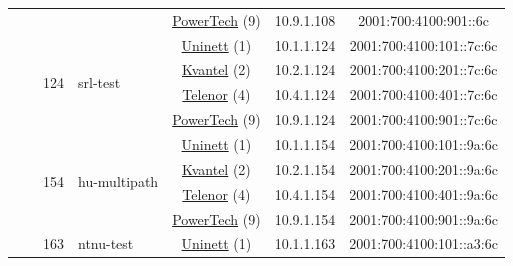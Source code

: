 \begin{small}
\begin{center}
\begin{longtable}{|c|c|c|c|c|c|c|c|}
  &  & \multicolumn{2}{|c|}{} & \multicolumn{2}{|c|}{\tiny{\href{http://www.powertech.no}{PowerTech} (9)}} & \tiny{10.9.1.108} & \tiny{2001:700:4100:901::6c} \\* \cline{3-3}\cline{4-4}\cline{5-5}\cline{6-6}\cline{7-7}\cline{8-8}
  &  & \multirow{4}{*}{\tiny{124}} & \multicolumn{1}{|l|}{\multirow{4}{*}{\tiny{srl-test}}} & \multicolumn{2}{|c|}{\tiny{\href{https://www.uninett.no}{Uninett} (1)}} & \tiny{10.1.1.124} & \tiny{2001:700:4100:101::7c:6c} \\* \cline{5-5}\cline{6-6}\cline{7-7}\cline{8-8}
  &  &  &  & \multicolumn{2}{|c|}{\tiny{\href{http://kvantel.no}{Kvantel} (2)}} & \tiny{10.2.1.124} & \tiny{2001:700:4100:201::7c:6c} \\* \cline{5-5}\cline{6-6}\cline{7-7}\cline{8-8}
  &  &  &  & \multicolumn{2}{|c|}{\tiny{\href{https://www.telenor.no}{Telenor} (4)}} & \tiny{10.4.1.124} & \tiny{2001:700:4100:401::7c:6c} \\* \cline{5-5}\cline{6-6}\cline{7-7}\cline{8-8}
  &  &  &  & \multicolumn{2}{|c|}{\tiny{\href{http://www.powertech.no}{PowerTech} (9)}} & \tiny{10.9.1.124} & \tiny{2001:700:4100:901::7c:6c} \\* \cline{3-3}\cline{4-4}\cline{5-5}\cline{6-6}\cline{7-7}\cline{8-8}
  &  & \multirow{4}{*}{\tiny{154}} & \multicolumn{1}{|l|}{\multirow{4}{*}{\tiny{hu-multipath}}} & \multicolumn{2}{|c|}{\tiny{\href{https://www.uninett.no}{Uninett} (1)}} & \tiny{10.1.1.154} & \tiny{2001:700:4100:101::9a:6c} \\* \cline{5-5}\cline{6-6}\cline{7-7}\cline{8-8}
  &  &  &  & \multicolumn{2}{|c|}{\tiny{\href{http://kvantel.no}{Kvantel} (2)}} & \tiny{10.2.1.154} & \tiny{2001:700:4100:201::9a:6c} \\* \cline{5-5}\cline{6-6}\cline{7-7}\cline{8-8}
  &  &  &  & \multicolumn{2}{|c|}{\tiny{\href{https://www.telenor.no}{Telenor} (4)}} & \tiny{10.4.1.154} & \tiny{2001:700:4100:401::9a:6c} \\* \cline{5-5}\cline{6-6}\cline{7-7}\cline{8-8}
  &  &  &  & \multicolumn{2}{|c|}{\tiny{\href{http://www.powertech.no}{PowerTech} (9)}} & \tiny{10.9.1.154} & \tiny{2001:700:4100:901::9a:6c} \\* \cline{3-3}\cline{4-4}\cline{5-5}\cline{6-6}\cline{7-7}\cline{8-8}
  &  & \multirow{4}{*}{\tiny{163}} & \multicolumn{1}{|l|}{\multirow{4}{*}{\tiny{ntnu-test}}} & \multicolumn{2}{|c|}{\tiny{\href{https://www.uninett.no}{Uninett} (1)}} & \tiny{10.1.1.163} & \tiny{2001:700:4100:101::a3:6c} \\* \cline{5-5}\cline{6-6}\cline{7-7}\cline{8-8}

\end{longtable}
\end{center}
\end{small}
